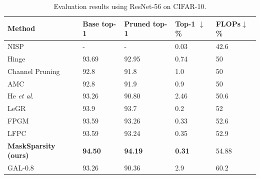 \documentclass[review]{cvpr}
\begin{document}
\begin{table}[ht]\small
	\caption{Evaluation results using ResNet-56 on CIFAR-10.}

	\setlength{\tabcolsep}{0.01em}
	\begin{center}
		\begin{tabular}{lllll}	
			\hline
			
			Method 							&Base top-1		&Pruned top-1	& Top-1 $\downarrow$\% 	&FLOPs$\downarrow$\%	 			\\
 			 \hline
			
		
			
		    NISP \cite{yu2018nisp}   &-         &-   &0.03 &42.6 \\
			
            Hinge \cite{Hinge}   &93.69        &92.95   &0.74            &50       \\
			Channel Pruning \cite{he2017channel}	&	92.8	&	91.8			&	1.0 	&	50		\\
			AMC \cite{he2018amc}					&	92.8	&	91.9			&	0.9		&	50		\\
			He \emph{et al}. \cite{he2017channel}    &93.26      &90.80   &2.46             &50.6       \\
			
			LeGR \cite{LeGR}   &93.9        &93.7   &0.2            &52 \\
			
			
			FPGM \cite{FPGM}						&	93.59	&93.26	&	0.33	&	52.6\\
			LFPC \cite{he2020learning}				&	93.59	&93.24	&	0.35	&	52.9\\
			\textbf{MaskSparsity (ours)}			&	\textbf{94.50}	&	\textbf{94.19}	&\textbf{0.31}	& 54.88	\\	
			GAL-0.8 \cite{GAL}   &93.26      &90.36     &2.9         &60.2  \\
			

\end{tabular}
\end{center}
\end{table}
\end{document}
